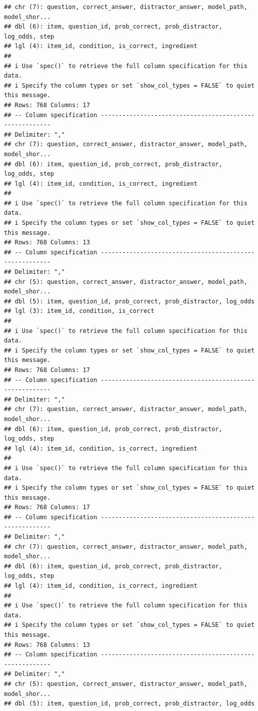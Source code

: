\documentclass[
]{article}
\begin{document}
\begin{verbatim}
## chr (7): question, correct_answer, distractor_answer, model_path, model_shor...
## dbl (6): item, question_id, prob_correct, prob_distractor, log_odds, step
## lgl (4): item_id, condition, is_correct, ingredient
## 
## i Use `spec()` to retrieve the full column specification for this data.
## i Specify the column types or set `show_col_types = FALSE` to quiet this message.
## Rows: 768 Columns: 17
## -- Column specification --------------------------------------------------------
## Delimiter: ","
## chr (7): question, correct_answer, distractor_answer, model_path, model_shor...
## dbl (6): item, question_id, prob_correct, prob_distractor, log_odds, step
## lgl (4): item_id, condition, is_correct, ingredient
## 
## i Use `spec()` to retrieve the full column specification for this data.
## i Specify the column types or set `show_col_types = FALSE` to quiet this message.
## Rows: 768 Columns: 13
## -- Column specification --------------------------------------------------------
## Delimiter: ","
## chr (5): question, correct_answer, distractor_answer, model_path, model_shor...
## dbl (5): item, question_id, prob_correct, prob_distractor, log_odds
## lgl (3): item_id, condition, is_correct
## 
## i Use `spec()` to retrieve the full column specification for this data.
## i Specify the column types or set `show_col_types = FALSE` to quiet this message.
## Rows: 768 Columns: 17
## -- Column specification --------------------------------------------------------
## Delimiter: ","
## chr (7): question, correct_answer, distractor_answer, model_path, model_shor...
## dbl (6): item, question_id, prob_correct, prob_distractor, log_odds, step
## lgl (4): item_id, condition, is_correct, ingredient
## 
## i Use `spec()` to retrieve the full column specification for this data.
## i Specify the column types or set `show_col_types = FALSE` to quiet this message.
## Rows: 768 Columns: 17
## -- Column specification --------------------------------------------------------
## Delimiter: ","
## chr (7): question, correct_answer, distractor_answer, model_path, model_shor...
## dbl (6): item, question_id, prob_correct, prob_distractor, log_odds, step
## lgl (4): item_id, condition, is_correct, ingredient
## 
## i Use `spec()` to retrieve the full column specification for this data.
## i Specify the column types or set `show_col_types = FALSE` to quiet this message.
## Rows: 768 Columns: 13
## -- Column specification --------------------------------------------------------
## Delimiter: ","
## chr (5): question, correct_answer, distractor_answer, model_path, model_shor...
## dbl (5): item, question_id, prob_correct, prob_distractor, log_odds

\end{verbatim}
\end{document}
